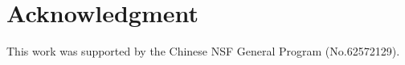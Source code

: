\section*{Acknowledgment}

This work was supported by the Chinese NSF General Program (No.62572129).